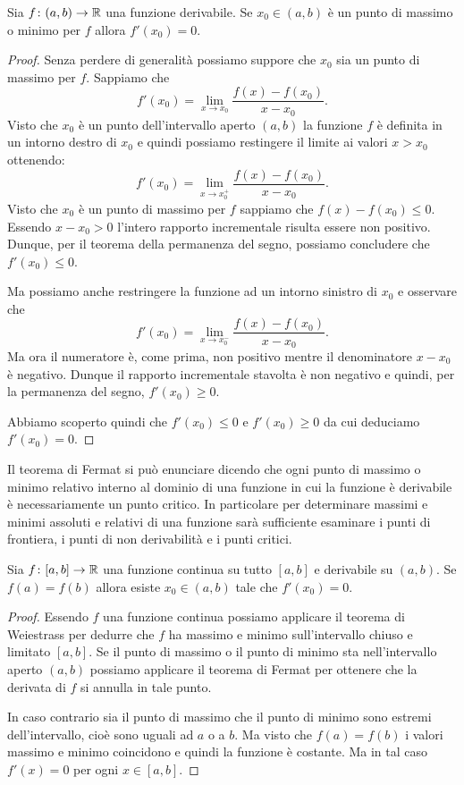 \begin{theorem}[Fermat]
\mymark{***}
Sia $f\colon (a,b)\to {\mathbb R}$ una funzione derivabile.
Se $x_0\in (a,b)$ è un punto di massimo o minimo per $f$ allora
$f'(x_0)=0$.
\end{theorem}
%
\begin{proof}
\mymark{***}
Senza perdere di generalità possiamo suppore che $x_0$ sia un punto di massimo per $f$.
Sappiamo che
\[
  f'(x_0) = \lim_{x\to x_0}\frac{f(x)-f(x_0)}{x-x_0}.
\]
Visto che $x_0$ è un punto dell'intervallo aperto $(a,b)$ la funzione $f$ è definita in un intorno destro di $x_0$ e quindi possiamo restingere il limite ai valori $x>x_0$ ottenendo:
\[
  f'(x_0) = \lim_{x\to x_0^+}\frac{f(x) - f(x_0)}{x-x_0}.
\]
Visto che $x_0$ è un punto di massimo per $f$ sappiamo che $f(x)-f(x_0)\le 0$. Essendo $x-x_0>0$ l'intero rapporto incrementale risulta essere non positivo.
Dunque, per il teorema della permanenza del segno,
possiamo concludere che $f'(x_0)\le 0$.

Ma possiamo anche restringere la funzione ad un intorno sinistro di $x_0$ e osservare che
\[
  f'(x_0) = \lim_{x\to x_0^-}\frac{f(x)-f(x_0)}{x-x_0}.
\]
Ma ora il numeratore è, come prima, non positivo mentre il denominatore $x-x_0$ è negativo. Dunque il rapporto incrementale stavolta è non negativo e quindi, per la permanenza del segno, $f'(x_0) \ge 0$.

Abbiamo scoperto quindi che $f'(x_0)\le 0$ e $f'(x_0)\ge 0$
da cui deduciamo $f'(x_0)=0$.
\end{proof}

Il teorema di Fermat si può
enunciare dicendo che ogni punto di massimo o minimo relativo interno
al dominio di una funzione in cui la funzione è derivabile
è necessariamente un punto critico.
In particolare per determinare massimi e minimi assoluti e relativi
di una funzione sarà sufficiente esaminare i punti di frontiera,
i punti di non derivabilità e i punti critici.


\begin{theorem}[Rolle]
\mymark{***}
%
Sia $f\colon [a,b]\to {\mathbb R}$ una funzione continua su tutto $[a,b]$ e derivabile su $(a,b)$. Se $f(a) = f(b)$ allora esiste $x_0 \in (a,b)$ tale che $f'(x_0)=0$.
\end{theorem}
%
\begin{proof}
\mymark{***}
Essendo $f$ una funzione continua
possiamo applicare il teorema di Weiestrass per dedurre che $f$ ha massimo e 
minimo sull'intervallo chiuso e limitato $[a,b]$. 
Se il punto di massimo o il punto di minimo sta nell'intervallo aperto 
$(a,b)$ possiamo applicare il teorema di Fermat per ottenere che la derivata 
di $f$ si annulla in tale punto.

In caso contrario sia il punto di massimo che il punto di minimo sono estremi 
dell'intervallo, cioè sono uguali ad $a$ o a $b$. Ma visto che $f(a)=f(b)$ 
i valori massimo e minimo coincidono e quindi la funzione è costante. 
Ma in tal caso $f'(x)=0$ per ogni $x\in [a,b]$.
\end{proof}

